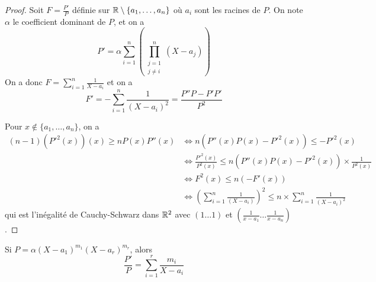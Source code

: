 \documentclass[12pt]{article}
\begin{document}
\begin{proof}
	Soit $F=\frac{P'}{P}$ définie sur $\mathbb{R}\setminus\{a_{1},\dots,a_{n}\}$ où $a_{i}$ sont les racines de $P$. On note $\alpha$ le coefficient dominant de $P$, et on a 
	\begin{equation}
		P'=\alpha\sum_{i=1}^{n}\left(\prod_{\substack{j=1\\ j\neq i}}^{n}(X-a_{j})\right)
	\end{equation}
	On a donc $F=\sum_{i=1}^{n}\frac{1}{X-a_{i}}$ et on a 
	\begin{equation}
		F'=-\sum_{i=1}^{n}\frac{1}{(X-a_{i})^{2}}=\frac{P''P-P'P'}{P^{2}}
	\end{equation}

	Pour $x\notin\{a_{1},\dots,a_{n}\}$, on a 
	\begin{align}
		(n-1)(P'^{2}(x))(x)\geqslant nP(x)P''(x)
		&\Longleftrightarrow n(P''(x)P(x)-P'^{2}(x))\leqslant-P'^{2}(x)\\
		&\Longleftrightarrow \frac{P'^{2}(x)}{P^{2}(x)}\leqslant n(P''(x)P(x)-P'^{2}(x))\times\frac{1}{P^{2}(x)}\\
		&\Longleftrightarrow F^{2}(x)\leqslant n(-F'(x))\\
		&\Longleftrightarrow\left(\sum_{i=1}^{n}\frac{1}{(X-a_{i})}\right)^{2}\leqslant \boxed{n\times\sum_{i=1}^{n}\frac{1}{(X-a_{i})^{2}}}
	\end{align}
	qui est l'inégalité de Cauchy-Schwarz dans $\mathbb{R}^{2}$ avec $(1\dots 1)$ et $(\frac{1}{x-a_{1}}\dots\frac{1}{x-a_{n}})$.
\end{proof}

\begin{remark}
	Si $P=\alpha(X-a_{1})^{m_{1}}(X-a_{r})^{m_{r}}$, alors 
	\begin{equation}
		\frac{P'}{P}=\sum_{i=1}^{r}\frac{m_{i}}{X-a_{i}}
	\end{equation}
\end{remark}
\end{document}
